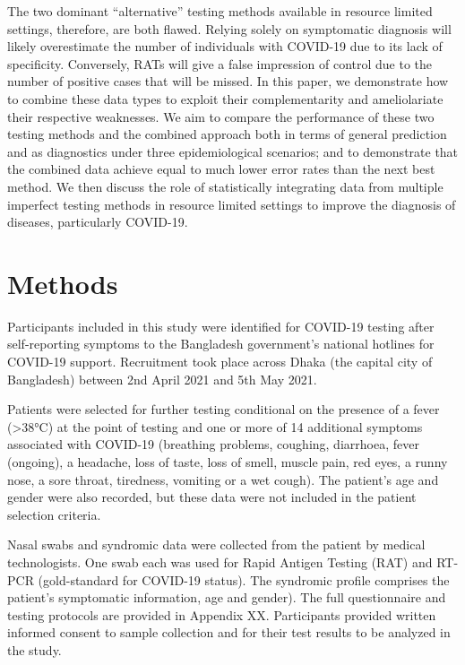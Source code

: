 \documentclass[]{elsarticle} %
\begin{document}
The two dominant ``alternative'' testing methods available in resource
limited settings, therefore, are both flawed. Relying solely on
symptomatic diagnosis will likely overestimate the number of individuals
with COVID-19 due to its lack of specificity. Conversely, RATs will give
a false impression of control due to the number of positive cases that
will be missed. In this paper, we demonstrate how to combine these data
types to exploit their complementarity and ameliolariate their
respective weaknesses. We aim to compare the performance of these two
testing methods and the combined approach both in terms of general
prediction and as diagnostics under three epidemiological scenarios; and
to demonstrate that the combined data achieve equal to much lower error
rates than the next best method. We then discuss the role of
statistically integrating data from multiple imperfect testing methods
in resource limited settings to improve the diagnosis of diseases,
particularly COVID-19.

\hypertarget{methods}{%
\section{Methods}\label{methods}}

Participants included in this study were identified for COVID-19 testing
after self-reporting symptoms to the Bangladesh government's national
hotlines for COVID-19 support. Recruitment took place across Dhaka (the
capital city of Bangladesh) between 2nd April 2021 and 5th May 2021.

Patients were selected for further testing conditional on the presence
of a fever (\textgreater38°C) at the point of testing and one or more of
14 additional symptoms associated with COVID-19 (breathing problems,
coughing, diarrhoea, fever (ongoing), a headache, loss of taste, loss of
smell, muscle pain, red eyes, a runny nose, a sore throat, tiredness,
vomiting or a wet cough). The patient's age and gender were also
recorded, but these data were not included in the patient selection
criteria.

Nasal swabs and syndromic data were collected from the patient by
medical technologists. One swab each was used for Rapid Antigen Testing
(RAT) and RT-PCR (gold-standard for COVID-19 status). The syndromic
profile comprises the patient's symptomatic information, age and
gender). The full questionnaire and testing protocols are provided in
Appendix XX. Participants provided written informed consent to sample
collection and for their test results to be analyzed in the study.
\end{document}
